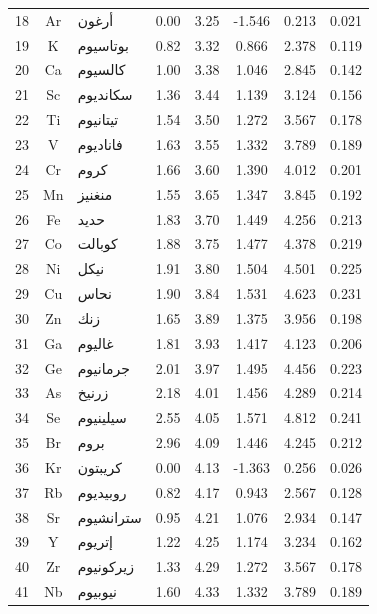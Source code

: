 \documentclass[12pt,a4paper]{article}
\theoremstyle{remark}
\begin{document}
\begin{longtable}{|c|c|p{2.5cm}|c|c|c|c|c|}
		18 & Ar & أرغون         & 0.00 & 3.25 & -1.546 & 0.213  & 0.021 \\
		19 & K  & بوتاسيوم      & 0.82 & 3.32 & 0.866  & 2.378  & 0.119 \\
		20 & Ca & كالسيوم       & 1.00 & 3.38 & 1.046  & 2.845  & 0.142 \\
		21 & Sc & سكانديوم      & 1.36 & 3.44 & 1.139  & 3.124  & 0.156 \\
		22 & Ti & تيتانيوم      & 1.54 & 3.50 & 1.272  & 3.567  & 0.178 \\
		23 & V  & فاناديوم      & 1.63 & 3.55 & 1.332  & 3.789  & 0.189 \\
		24 & Cr & كروم          & 1.66 & 3.60 & 1.390  & 4.012  & 0.201 \\
		25 & Mn & منغنيز        & 1.55 & 3.65 & 1.347  & 3.845  & 0.192 \\
		26 & Fe & حديد          & 1.83 & 3.70 & 1.449  & 4.256  & 0.213 \\
		27 & Co & كوبالت        & 1.88 & 3.75 & 1.477  & 4.378  & 0.219 \\
		28 & Ni & نيكل          & 1.91 & 3.80 & 1.504  & 4.501  & 0.225 \\
		29 & Cu & نحاس          & 1.90 & 3.84 & 1.531  & 4.623  & 0.231 \\
		30 & Zn & زنك           & 1.65 & 3.89 & 1.375  & 3.956  & 0.198 \\
		31 & Ga & غاليوم        & 1.81 & 3.93 & 1.417  & 4.123  & 0.206 \\
		32 & Ge & جرمانيوم      & 2.01 & 3.97 & 1.495  & 4.456  & 0.223 \\
		33 & As & زرنيخ         & 2.18 & 4.01 & 1.456  & 4.289  & 0.214 \\
		34 & Se & سيلينيوم      & 2.55 & 4.05 & 1.571  & 4.812  & 0.241 \\
		35 & Br & بروم          & 2.96 & 4.09 & 1.446  & 4.245  & 0.212 \\
		36 & Kr & كريبتون       & 0.00 & 4.13 & -1.363 & 0.256  & 0.026 \\
		37 & Rb & روبيديوم      & 0.82 & 4.17 & 0.943  & 2.567  & 0.128 \\
		38 & Sr & سترانشيوم     & 0.95 & 4.21 & 1.076  & 2.934  & 0.147 \\
		39 & Y  & إتريوم        & 1.22 & 4.25 & 1.174  & 3.234  & 0.162 \\
		40 & Zr & زيركونيوم     & 1.33 & 4.29 & 1.272  & 3.567  & 0.178 \\
		41 & Nb & نيوبيوم       & 1.60 & 4.33 & 1.332  & 3.789  & 0.189 \\

\end{longtable}
\end{document}
